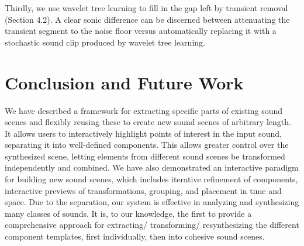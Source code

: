 \documentclass[twoside]{article}
\begin{document}
Thirdly, we use wavelet tree learning to fill in the gap left by 
transient removal (Section 4.2). A clear sonic difference
can be discerned between attenuating the transient segment to the noise floor versus 
automatically replacing it with a stochastic sound clip 
produced by wavelet tree learning. 


\section{Conclusion and Future Work}

We have described a framework for extracting specific parts of existing sound scenes and 
flexibly reusing these to create new sound scenes of arbitrary length. 
It allows users to interactively highlight points of interest in the input 
sound, separating it into well-defined components. This allows greater control 
over the synthesized scene, letting elements from different 
sound scenes be transformed independently and combined.
We have also demonstrated an interactive paradigm for building new sound scenes, which 
includes iterative refinement of components, interactive previews of transformations, 
grouping, and placement 
in time and space.  Due to the separation, our system is effective in analyzing and 
synthesizing many classes of sounds. It is, to our knowledge, the first to 
provide a comprehensive approach 
for extracting/ transforming/ resynthesizing the different component templates, first
individually, then into cohesive sound scenes.
\end{document}
